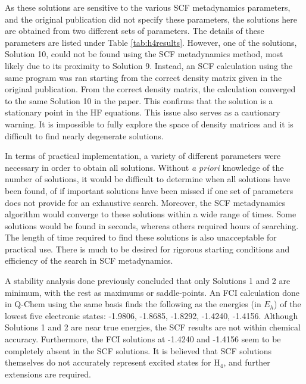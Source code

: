 \documentclass[final,3p,times,twocolumn]{elsarticle}
\begin{document}
As these solutions are sensitive to the various SCF metadynamics parameters, and the original publication did not specify these parameters, the solutions here are obtained from two different sets of parameters. The details of these parameters are listed under Table \ref{tab:h4results}. However, one of the solutions, Solution 10, could not be found using the SCF metadynamics method, most likely due to its proximity to Solution 9. Instead, an SCF calculation using the same program was ran starting from the correct density matrix given in the original publication. From the correct density matrix, the calculation converged to the same Solution 10 in the paper. This confirms that the solution is a stationary point in the HF equations. This issue also serves as a cautionary warning. It is impossible to fully explore the space of density matrices and it is difficult to find nearly degenerate solutions. 

In terms of practical implementation, a variety of different parameters were necessary in order to obtain all solutions. Without \textit{a priori} knowledge of the number of solutions, it would be difficult to determine when all solutions have been found, of if important solutions have been missed if one set of parameters does not provide for an exhaustive search. Moreover, the SCF metadynamics algorithm would converge to these solutions within a wide range of times. Some solutions would be found in seconds, whereas others required hours of searching. The length of time required to find these solutions is also unacceptable for practical use. There is much to be desired for rigorous starting conditions and efficiency of the search in SCF metadynamics.

A stability analysis done previously concluded that only Solutions 1 and 2 are minimum, with the rest as maximums or saddle-points. An FCI calculation done in Q-Chem\cite{qchem} using the same basis finds the following as the energies (in $E_h$) of the lowest five electronic states: -1.9806, -1.8685, -1.8292, -1.4240, -1.4156. Although Solutions 1 and 2 are near true energies, the SCF results are not within chemical accuracy. Furthermore, the FCI solutions at -1.4240 and -1.4156 seem to be completely absent in the SCF solutions. It is believed that SCF solutions themselves do not accurately represent excited states for H$_4$, and further extensions are required.
\end{document}
